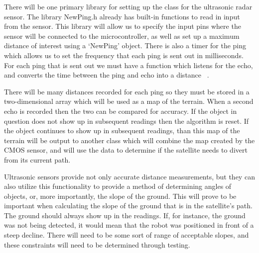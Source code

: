 \documentclass[10pt,letterpaper,onecolumn,journal]{IEEEtran}
\begin{document}
\par 
There will be one primary library for setting up the class for the ultrasonic radar sensor. The library NewPing.h already has built-in functions to read in input from the sensor. This library will allow us to specify the input pins where the sensor will be connected to the microcontroller, as well as set up a maximum distance of interest using a ‘NewPing’ object. There is also a timer for the ping which allows us to set the frequency that each ping is sent out in milliseconds. For each ping that is sent out we must have a function which listens for the echo, and converts the time between the ping and echo into a distance ~\cite{grinberg2013}.\vspace{.3cm}
\par 
There will be many distances recorded for each ping so they must be stored in a two-dimensional array which will be used as a map of the terrain. When a second echo is recorded then the two can be compared for accuracy. If the object in question does not show up in subsequent readings then the algorithm is reset. If the object continues to show up in subsequent readings, than this map of the terrain will be output to another class which will combine the map created by the CMOS sensor, and will use the data to determine if the satellite needs to divert from its current path.\vspace{.3cm}
\par 
Ultrasonic sensors provide not only accurate distance measurements, but they can also utilize this functionality to provide a method of determining angles of objects, or, more importantly, the slope of the ground. This will prove to be important when calculating the slope of the ground that is in the satellite's path. The ground should always show up in the readings. If, for instance, the ground was not being detected, it would mean that the robot was positioned in front of a steep decline. There will need to be some sort of range of acceptable slopes, and these constraints will need to be determined through testing.
\end{document}
